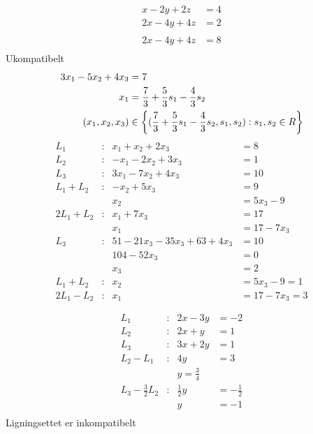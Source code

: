 \begin{align*}
  x-2y+2z &= 4\\
  2x-4y+4z &= 2\\
  \\
  2x-4y+4z &= 8\\
\end{align*}
Ukompatibelt
\begin{align*}
  3x_1 - 5x_2 +4x_3 &= 7\\
  x_1 &= \frac{7}{3}+\frac{5}{3}s_1- \frac{4}{3}s_2\\
  (x_1, x_2, x_3) &\in \left\{ (\frac{7}{3}+\frac{5}{3}s_1- \frac{4}{3}s_2, s_1,s_2) : s_1, s_2 \in R \right \}
\end{align*}
\begin{align*}
  L_1&:&x_1 + x_2 +2x_3 &= 8\\
  L_2&:&-x_1 -2x_2 +3x_3 &= 1\\
  L_3&:&3x_1-7x_2 +4x_3 &= 10\\
  L_1+L_2&:& -x_2+5x_3 &= 9\\
     && x_2       &=5x_3- 9\\
  2L_1+L_2&:&x_1+7x_3 &=17\\
     &&x_1       &=17-7x_3\\
  L_3 &:& 51-21x_3-35x_3+63+4x_3 &= 10\\
  && 104-52x_3&=0\\
  && x_3 &= 2\\
  L_1+L_2 &:&  x_2&=5x_3-9=1\\
  2L_1-L_2 &:& x_1&=17-7x_3=3\\
  \\
\end{align*}
\begin{align*}
  L_1 &:& 2x-3y&=-2\\
  L_2 &:& 2x + y &=1 \\
  L_3 &:& 3x+2y &= 1\\
  L_2-L_1 &:& 4y &=3\\
  && y = \frac{3}{4}\\
  L_3-\frac{3}{2}L_2 &:& \frac{1}{2}y &= -\frac{1}{2}\\
  &&y &=-1\\
\end{align*}
Ligningsettet er inkompatibelt

